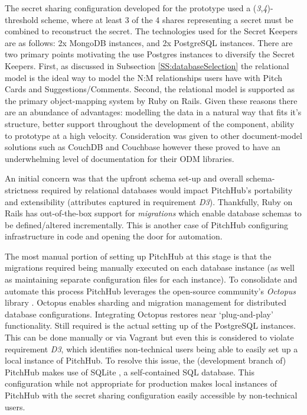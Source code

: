 The secret sharing configuration developed for the prototype used a (\textit{3},\textit{4})-threshold scheme, where at least 3 of the 4 shares representing a secret must be combined to reconstruct the secret. The technologies used for the Secret Keepers are as follows: 2x MongoDB instances, and 2x PostgreSQL instances. There are two primary points motivating the use Postgres instances to diversify the Secret Keepers. First, as discussed in Subsection \ref{SS:databaseSelection} the relational model is the ideal way to model the N:M relationships users have with Pitch Cards and Suggestions/Comments. Second, the relational model is supported as the primary object-mapping system by Ruby on Rails. Given these reasons there are an abundance of advantages: modelling the data in a natural way that fits it's structure, better support throughout the development of the component, ability to prototype at a high velocity. Consideration was given to other document-model solutions such as CouchDB \cite{Apach2:online} and Couchbase \cite{Accel4:online} however these proved to have an underwhelming level of documentation for their ODM libraries.
\par
An initial concern was that the upfront schema set-up and overall schema-strictness required by relational databases would impact PitchHub's portability and extensibility (attributes captured in requirement \textit{D3}). Thankfully, Ruby on Rails has out-of-the-box support for \textit{migrations} which enable database schemas to be defined/altered incrementally. This is another case of PitchHub configuring infrastructure in code and opening the door for automation.
\par
The most manual portion of setting up PitchHub at this stage is that the migrations required being manually executed on each database instance (as well as maintaining separate configuration files for each instance). To consolidate and automate this process PitchHub leverages the open-source community's \textit{Octopus} library \cite{tchan7:online}. Octopus enables sharding and migration management for distributed database configurations. Integrating Octopus restores near `plug-and-play' functionality. Still required is the actual setting up of the PostgreSQL instances. This can be done manually or via Vagrant but even this is considered to violate requirement \textit{D3}, which identifies non-technical users being able to easily set up a local instance of PitchHub. To resolve this issue, the (development branch of) PitchHub makes use of SQLite \cite{SQLit5:online}, a self-contained SQL database. This configuration while not appropriate for production makes local instances of PitchHub with the secret sharing configuration easily accessible by non-technical users.